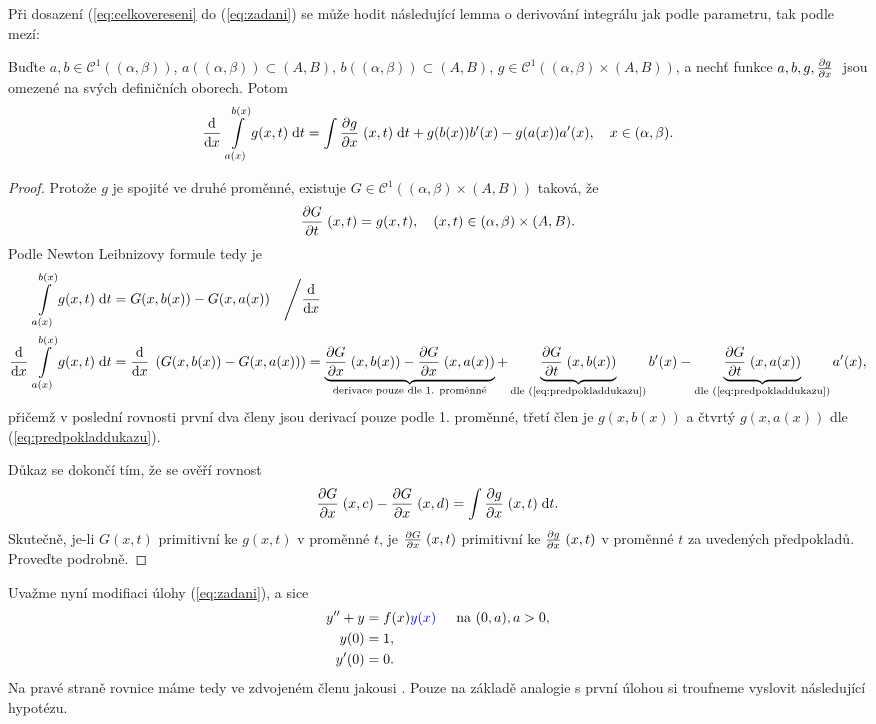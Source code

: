 \Poznamka Při dosazení (\ref{eq:celkovereseni} do (\ref{eq:zadani}) se může hodit následující lemma o derivování integrálu jak podle parametru, tak podle mezí:

\lemma\label{lemma:derivacemezi}

Buďte $a,b\in\mathcal{C}^1((\alpha,\beta))$, $a((\alpha,\beta))\subset (A,B)$, $b((\alpha,\beta))\subset (A,B)$, $g\in\mathcal{C}^1((\alpha,\beta)\times(A,B))$, a nechť funkce $a,b,g,\frac{\partial g}{\partial x} \;$ jsou omezené na svých definičních oborech. Potom
\begin{equation}
    \frac{\mathrm{d} }{\mathrm{d} x} \;\int\limits_{a(x)}^{b(x)}g(x,t)\;\mathrm{d}t = \int\limits\frac{\partial g}{\partial x} \;(x,t)\;\mathrm{d}t + g(b(x))b'(x)-g(a(x))a'(x), \quad x\in(\alpha,\beta).
\end{equation}
\begin{proof}
Protože $g$ je spojité ve druhé proměnné, existuje $G\in \mathcal{C}^1((\alpha,\beta)\times(A,B))$ taková, že 
\begin{equation}
    \frac{\partial G}{\partial t} \;(x,t)=g(x,t),\quad (x,t)\in (\alpha,\beta)\times(A,B).
    \label{eq:predpokladdukazu}
\end{equation}
Podle Newton Leibnizovy formule tedy je 
\begin{equation}
    \begin{split}
        \int\limits_{a(x)}^{b(x)}g(x,t)\;\mathrm{d}t &= G(x,b(x))-G(x,a(x)) \quad \Bigg/ \frac{\mathrm{d} }{\mathrm{d} x} \;\\
        \frac{\mathrm{d} }{\mathrm{d} x} \;\int\limits_{a(x)}^{b(x)}g(x,t)\;\mathrm{d}t &= \frac{\mathrm{d} }{\mathrm{d} x} \; \left(G(x,b(x))-G(x,a(x))\right) = \underbrace{\frac{\partial G}{\partial x} \;(x,b(x))-\frac{\partial G}{\partial x} \;(x,a(x))}_{\text{derivace pouze dle 1. proměnné}}+\underbrace{\frac{\partial G}{\partial t} \;(x,b(x))}_{\text{dle (\ref{eq:predpokladdukazu})}}b'(x)-\underbrace{\frac{\partial G}{\partial t} \;(x,a(x))}_{\text{dle (\ref{eq:predpokladdukazu})}}a'(x),
    \end{split}
\end{equation}
přičemž v poslední rovnosti první dva členy jsou derivací pouze podle 1. proměnné, třetí člen je $g(x,b(x))$ a čtvrtý $g(x,a(x))$ dle (\ref{eq:predpokladdukazu}).

Důkaz se dokončí tím, že se ověří rovnost
\begin{equation}
    \frac{\partial G}{\partial x} \;(x,c)-\frac{\partial G}{\partial x} \;(x,d)=\int\limits\frac{\partial g}{\partial x} \;(x,t)\;\mathrm{d}t.
\end{equation}
Skutečně, je-li $G(x,t)$ primitivní ke $g(x,t)$ v proměnné $t$, je $\frac{\partial G}{\partial x} \;(x,t)$ primitivní ke $\frac{\partial g}{\partial x} \;(x,t)$ v proměnné $t$ za uvedených předpokladů. Proveďte podrobně.
\end{proof}

Uvažme nyní modifiaci úlohy (\ref{eq:zadani}), a sice 
\begin{equation}
    \begin{split}
        y''+y&=f(x)\textcolor{blue}{y(x)} \text{\;\;\;\; na } (0,a), a>0,\\
        y(0)&=1,\\
        y'(0)&=0.
    \end{split}
    \label{eq:zadani_y(x)_vpravo}
\end{equation}
Na pravé straně rovnice máme tedy ve zdvojeném členu jakousi . Pouze na základě analogie s první úlohou si troufneme vyslovit následující hypotézu.

